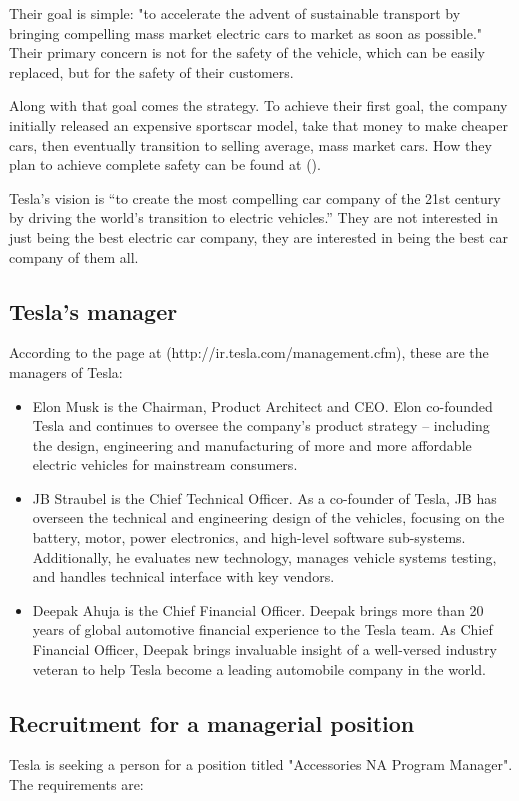 \documentclass[12pt]{article}
\begin{document}
Their goal is simple: "to accelerate the advent of sustainable transport by bringing compelling mass market electric cars to market as soon as possible." Their primary concern is not for the safety of the vehicle, which can be easily replaced, but for the safety of their customers.

Along with that goal comes the strategy. To achieve their first goal, the company initially released an expensive sportscar model, take that money to make cheaper cars, then eventually transition to selling average, mass market cars. How they plan to achieve complete safety can be found at (\cite{mu13}).

Tesla's vision is “to create the most compelling car company of the 21st century by driving the world’s transition to electric vehicles.” They are not interested in just being the best electric car company, they are interested in being the best car company of them all.

\subsection{Tesla's manager}

According to the page at (http://ir.tesla.com/management.cfm), these are the managers of Tesla:

\begin{itemize}
	\item{Elon Musk is the Chairman, Product Architect and CEO. Elon co-founded Tesla and continues to oversee the company's product strategy -- including the design, engineering and manufacturing of more and more affordable electric vehicles for mainstream consumers.}
	\item{JB Straubel is the Chief Technical Officer. As a co-founder of Tesla, JB has overseen the technical and engineering design of the vehicles, focusing on the battery, motor, power electronics, and high-level software sub-systems. Additionally, he evaluates new technology, manages vehicle systems testing, and handles technical interface with key vendors.}
	\item{Deepak Ahuja is the Chief Financial Officer. Deepak brings more than 20 years of global automotive financial experience to the Tesla team. As Chief Financial Officer, Deepak brings invaluable insight of a well-versed industry veteran to help Tesla become a leading automobile company in the world.}

\end{itemize}

\subsection{Recruitment for a managerial position}
Tesla is seeking a person for a position titled "Accessories NA Program Manager". The requirements are:
\end{document}
